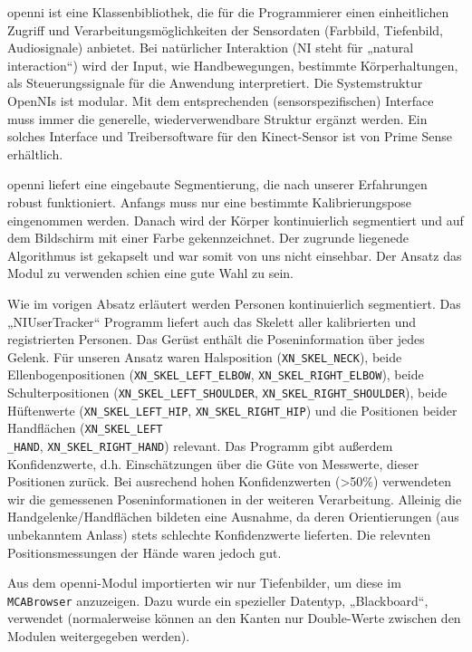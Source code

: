 \gls{openni} ist eine Klassenbibliothek, die für die Programmierer einen einheitlichen Zugriff und Verarbeitungsmöglichkeiten
 der Sensordaten (Farbbild, Tiefenbild, Audiosignale) anbietet. Bei natürlicher Interaktion (NI steht für „natural interaction“) wird der Input,
 wie Handbewegungen, bestimmte Körperhaltungen, als Steuerungssignale für die Anwendung interpretiert. Die Systemstruktur OpenNIs ist modular.
 Mit dem entsprechenden (sensorspezifischen) Interface muss immer die generelle, wiederverwendbare Struktur ergänzt werden.
 Ein solches Interface und Treibersoftware für den Kinect-Sensor ist von Prime
 Sense erhältlich. 

\gls{openni} liefert eine eingebaute Segmentierung, die nach unserer Erfahrungen robust funktioniert.
 Anfangs muss nur eine bestimmte Kalibrierungspose eingenommen werden. Danach wird der Körper kontinuierlich segmentiert und
 auf dem Bildschirm mit einer Farbe gekennzeichnet. Der zugrunde liegenede Algorithmus ist gekapselt und war somit von uns nicht einsehbar.
 Der Ansatz das Modul zu verwenden schien eine gute Wahl zu sein.

Wie im vorigen Absatz erläutert werden Personen kontinuierlich segmentiert. Das
„NIUserTracker“ Programm liefert auch das Skelett aller kalibrierten und registrierten Personen. Das Gerüst enthält die Poseninformation über jedes
 Gelenk. Für unseren Ansatz waren Halsposition (\lstinline{XN_SKEL_NECK}), beide
 Ellenbogenpositionen (\lstinline{XN_SKEL_LEFT_ELBOW},
 \lstinline{XN_SKEL_RIGHT_ELBOW}), beide Schulterpositionen
 (\lstinline{XN_SKEL_LEFT_SHOULDER}, \lstinline{XN_SKEL_RIGHT_SHOULDER}), beide
 Hüftenwerte (\lstinline{XN_SKEL_LEFT_HIP}, \lstinline{XN_SKEL_RIGHT_HIP}) und
 die Positionen beider Handflächen (\lstinline{XN_SKEL_LEFT}\\\lstinline{_HAND},
 \lstinline{XN_SKEL_RIGHT_HAND}) relevant. Das Programm gibt außerdem
 Konfidenzwerte, d.h. Einschätzungen über die Güte von Messwerte, dieser Positionen zurück.
 Bei ausrechend hohen Konfidenzwerten (>50\%) verwendeten wir die gemessenen
 Poseninformationen in der weiteren Verarbeitung. Alleinig die Handgelenke/Handflächen bildeten eine Ausnahme,
 da deren Orientierungen (aus unbekanntem Anlass) stets schlechte Konfidenzwerte lieferten. Die relevnten Positionsmessungen der Hände waren jedoch gut.

Aus dem \gls{openni}-Modul importierten wir nur Tiefenbilder, um diese im
\lstinline{MCABrowser} anzuzeigen. Dazu wurde ein spezieller Datentyp,
„Blackboard“, verwendet (normalerweise können an den Kanten nur Double-Werte zwischen den Modulen weitergegeben werden).

